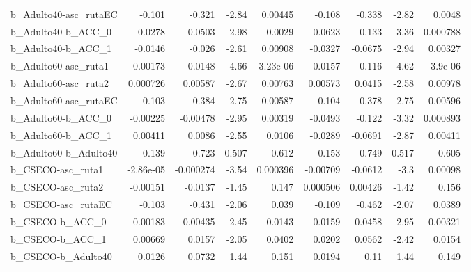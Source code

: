 \begin{tabular}{lrrrrrrrr}
b\_Adulto40-asc\_rutaEC      &      -0.101 &       -0.321 &     -2.84 &  0.00445 &     -0.108 &      -0.338 &        -2.82 &        0.0048 \\
b\_Adulto40-b\_ACC\_0         &     -0.0278 &      -0.0503 &     -2.98 &   0.0029 &    -0.0623 &      -0.133 &        -3.36 &      0.000788 \\
b\_Adulto40-b\_ACC\_1         &     -0.0146 &       -0.026 &     -2.61 &  0.00908 &    -0.0327 &     -0.0675 &        -2.94 &       0.00327 \\
b\_Adulto60-asc\_ruta1       &     0.00173 &       0.0148 &     -4.66 & 3.23e-06 &     0.0157 &       0.116 &        -4.62 &       3.9e-06 \\
b\_Adulto60-asc\_ruta2       &    0.000726 &      0.00587 &     -2.67 &  0.00763 &    0.00573 &      0.0415 &        -2.58 &       0.00978 \\
b\_Adulto60-asc\_rutaEC      &      -0.103 &       -0.384 &     -2.75 &  0.00587 &     -0.104 &      -0.378 &        -2.75 &       0.00596 \\
b\_Adulto60-b\_ACC\_0         &    -0.00225 &     -0.00478 &     -2.95 &  0.00319 &    -0.0493 &      -0.122 &        -3.32 &      0.000893 \\
b\_Adulto60-b\_ACC\_1         &     0.00411 &       0.0086 &     -2.55 &   0.0106 &    -0.0289 &     -0.0691 &        -2.87 &       0.00411 \\
b\_Adulto60-b\_Adulto40      &       0.139 &        0.723 &     0.507 &    0.612 &      0.153 &       0.749 &        0.517 &         0.605 \\
b\_CSECO-asc\_ruta1          &   -2.86e-05 &    -0.000274 &     -3.54 & 0.000396 &   -0.00709 &     -0.0612 &         -3.3 &       0.00098 \\
b\_CSECO-asc\_ruta2          &    -0.00151 &      -0.0137 &     -1.45 &    0.147 &   0.000506 &     0.00426 &        -1.42 &         0.156 \\
b\_CSECO-asc\_rutaEC         &      -0.103 &       -0.431 &     -2.06 &    0.039 &     -0.109 &      -0.462 &        -2.07 &        0.0389 \\
b\_CSECO-b\_ACC\_0            &     0.00183 &      0.00435 &     -2.45 &   0.0143 &     0.0159 &      0.0458 &        -2.95 &       0.00321 \\
b\_CSECO-b\_ACC\_1            &     0.00669 &       0.0157 &     -2.05 &   0.0402 &     0.0202 &      0.0562 &        -2.42 &        0.0154 \\
b\_CSECO-b\_Adulto40         &      0.0126 &       0.0732 &      1.44 &    0.151 &     0.0194 &        0.11 &         1.44 &         0.149 \\

\end{tabular}
